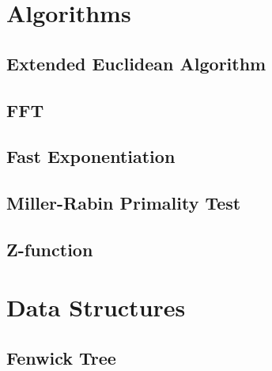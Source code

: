 \documentclass[12pt]{article}
\begin{document}
\tableofcontents

%
% 
%
% 

\section{Algorithms}

\subsection{Extended Euclidean Algorithm} 
\subsection{FFT} 
\subsection{Fast Exponentiation} 
\subsection{Miller-Rabin Primality Test} 
\subsection{Z-function} 

\section{Data Structures}

\subsection{Fenwick Tree} 
\end{document}
